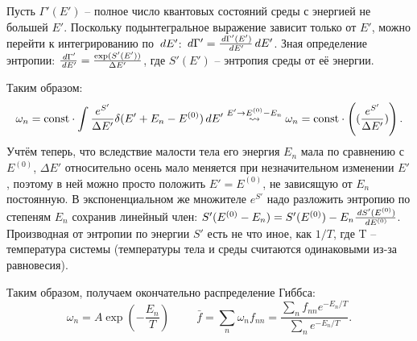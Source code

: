 Пусть $\Gamma'(E')$ -- полное число квантовых состояний среды с энергией не большей $E'$. 
Поскольку подынтегральное выражение зависит только от $E'$, можно перейти к интегрированию по $\, d E'$: $\, d \Gamma' = \frac{\, d \Gamma' (E')}{\, d E'}\, d E'$. Зная определение энтропии: $\frac{\, d \Gamma'}{\, d E'} = \frac{\exp(S'(E'))}{\Delta E'}$, где $S'(E')$ -- энтропия среды от её энергии.

Таким образом:
\begin{equation}
	\omega_n = \text{const} \cdot \int \frac{e^{S'}}{\Delta E'} \delta (E' + E_n - E^{(0)})\, d E' 
	\overset{E' \to E^{(0)} - E_n}{\leadsto}
	\omega_n = \text{const} \cdot \left((\frac{e^{S'}}{\Delta E'})\right).
\end{equation}
Учтём теперь, что вследствие малости тела его энергия $E_n$ мала по сравнению с $E^{(0)}$, $\Delta E'$ относительно осень мало меняется при незначительном изменении $E'$,
поэтому в ней можно просто положить $E' = E^{(0)}$, не зависящую от $E_n$ постоянную. 
В экспоненциальном же множителе $e^{S'}$ надо разложить энтропию по степеням $E_n$ сохранив линейный член: $S'(E^{(0)}-E_n) = S'(E^{(0)}) - E_n \frac{\, d S' (E^{(0)})}{\, d E^{(0)}}$.	
Производная от энтропии по энергии $S'$ есть не что иное, как $1/T$, где T -- температура системы (температуры тела и среды считаются одинаковыми из-за равновесия).

Таким образом, получаем окончательно распределение Гиббса:
\begin{equation}
	\boxed{\omega_n = A \exp \left(- \frac{E_n}{T}\right)} \hspace{1cm}
	\bar{f} = \sum\limits_{ n }^{  } \omega_n f_{n n } = \frac{\sum\limits_{ n }^{  } f_{n n} e^{-E_n/T}}{\sum\limits_{ n }^{  } e^{-E_n/T}}.
\end{equation}